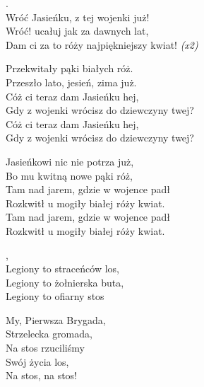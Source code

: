 \documentclass[12pt,a4paper,twoside]{songbook}
\begin{document}
  \begin{info}
    \lipsum[1]
  \end{info}
  \setlength{\vgap}{10pt}
  \begin{lyrics}
    .\\
    Wróć Jasieńku, z tej wojenki już!\\
    \vin Wróć! ucałuj jak za dawnych lat,\\
    \vin Dam ci za to róży najpiękniejszy kwiat! \emph{(x2)}
    
    Przekwitały pąki białych róż.\\
    Przeszło lato, jesień, zima już.\\
    Cóż ci teraz dam Jasieńku hej,\\
    Gdy z wojenki wrócisz do dziewczyny twej?\\
    
    Cóż ci teraz dam Jasieńku hej,\\
    Gdy z wojenki wrócisz do dziewczyny twej?
    
    Jasieńkowi nic nie potrza już,\\
    Bo mu kwitną nowe pąki róż,\\
    Tam nad jarem, gdzie w wojence padł\\
    Rozkwitł u mogiły białej róży kwiat.\\
    Tam nad jarem, gdzie w wojence padł\\
    Rozkwitł u mogiły białej róży kwiat.\\
  \end{lyrics}


  \begin{info}
    \lipsum[1]
  \end{info}

  \begin{lyrics}[longestline=Legiony to straceńców los]
  , \\
  Legiony to straceńców los, \\
  Legiony to żołnierska buta, \\
  Legiony to ofiarny stos
  
  My, Pierwsza Brygada,\\
  Strzelecka gromada,\\
  Na stos rzuciliśmy\\
  Swój życia los,\\
  Na stos, na stos!
  \end{lyrics}
\end{document}
